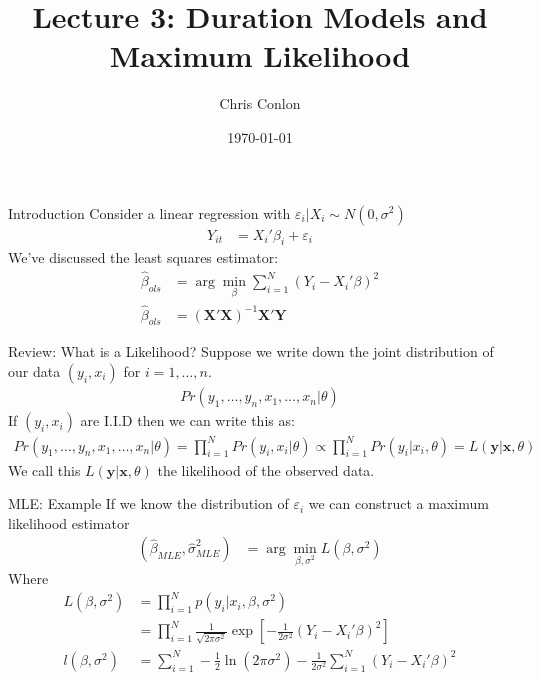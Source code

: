 \documentclass[aspectratio=169]{beamer}
\title{Lecture 3: Duration Models and Maximum Likelihood}
\author{Chris Conlon }
\institute{NYU Stern }
\date{\today}
\begin{document}
\maketitle

\begin{frame}{Introduction}
Consider a linear regression with $\varepsilon_i | X_i \sim N(0,\sigma^2)$
\begin{align*}
Y_{it} &= X_{i}'\beta_i + \varepsilon_{i}
\end{align*}
We've discussed the \alert{least squares estimator}:
\begin{align*}
\widehat{\beta}_{ols} &= \arg \min_{\beta} \sum_{i=1}^N (Y_i - X_i' \beta)^2\\
\widehat{\beta}_{ols} &= (\mathbf{X}'\mathbf{X})^{-1} \mathbf{X}' \mathbf{Y}
\end{align*}
\end{frame}


\begin{frame}{Review: What is a Likelihood?}
Suppose we write down the joint distribution of our data $(y_i,x_i)$ for $i=1,\ldots,n$.
\begin{align*}
Pr(y_1,\ldots,y_n, x_1,\ldots,x_n | \theta)
\end{align*}
If  $(y_i,x_i)$ are I.I.D then we can write this as:
\begin{align*}
 Pr(y_1,\ldots,y_n, x_1,\ldots,x_n | \theta) = \prod_{i=1}^N Pr(y_i, x_i | \theta) \propto \prod_{i=1}^N Pr(y_i | x_i , \theta)=L( \mathbf{y}| \mathbf{x} ,\theta )
\end{align*}
We call this $L( \mathbf{y}| \mathbf{x} ,\theta )$ the \alert{likelihood} of the observed data.
\end{frame}




\begin{frame}{MLE: Example}
If we know the distribution of $\varepsilon_i$ we can construct a \alert{maximum likelihood estimator}
\begin{align*}
(\widehat{\beta}_{MLE},\widehat{\sigma}^2_{MLE}) &= \arg \min_{\beta,\sigma^2} L(\beta,\sigma^2)
\end{align*}
Where 
\begin{align*} 
L(\beta,\sigma^2) &= \prod_{i=1}^N p(y_i | x_i,\beta,\sigma^2) \\
                  &= \prod_{i=1}^N \frac{1}{\sqrt{2 \pi \sigma^2}} \exp \left[-\frac{1}{2\sigma^2}(Y_i - X_i' \beta)^2 \right]\\
l(\beta,\sigma^2) &= \sum_{i=1}^N -\frac{1}{2} \ln (2 \pi \sigma^2) - \frac{1}{2 \sigma^2} \sum_{i=1}^N(Y_i - X_i' \beta)^2
\end{align*}
\end{frame}
\end{document}
